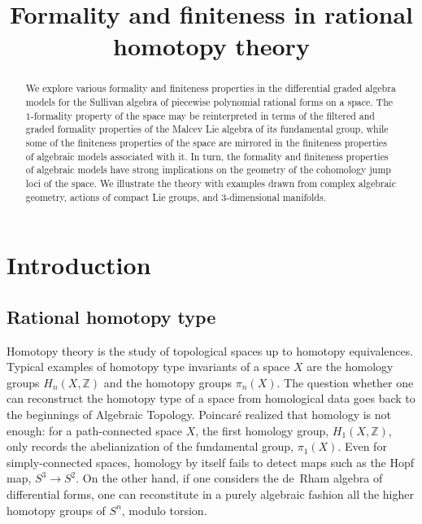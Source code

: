 \documentclass{article}
\title{Formality and finiteness in rational homotopy theory}
\numberwithin{equation}{section}
\theoremstyle{definition}
\newcommand{\Z}{\mathbb{Z}}
\begin{document}
\maketitle




\begin{abstract}
We explore various formality and finiteness properties in the 
differential graded algebra models for the Sullivan algebra 
of piecewise polynomial rational forms on a space.  
The $1$-formality property of the space may be reinterpreted 
in terms of the filtered and graded formality properties of 
the Malcev Lie algebra of its fundamental group, 
while some of the finiteness properties of the space are mirrored 
in the finiteness properties of algebraic models associated with it. 
In turn, the formality and finiteness properties of 
algebraic models have strong implications on the geometry 
of the cohomology jump loci of the space. We illustrate the 
theory with examples drawn from complex algebraic geometry, 
actions of compact Lie groups, and $3$-dimensional manifolds. 
\end{abstract}


\tableofcontents

\section{Introduction}
\label{sect:intro}

\subsection{Rational homotopy type}
\label{subsec:intro-rht}

Homotopy theory is the study of topological spaces up to 
homotopy equivalences. Typical examples of homotopy 
type invariants of a space $X$ are the homology 
groups $H_n(X,\Z)$ and the homotopy groups $\pi_n(X)$. 
The question whether one can reconstruct the homotopy type 
of a space from homological data goes back to the beginnings 
of Algebraic Topology.  Poincar\'{e} realized that homology is 
not enough:  for a path-connected space $X$, the first homology 
group, $H_1(X,\Z)$, only records the abelianization of the 
fundamental group, $\pi_1(X)$.  Even for simply-connected 
spaces, homology by itself fails to detect maps such as the 
Hopf map, $S^3\to S^2$.  On the other hand, if one considers 
the de~Rham algebra of differential forms, one can 
reconstitute in a purely algebraic fashion all the higher 
homotopy groups of $S^n$, modulo torsion.  
\end{document}
